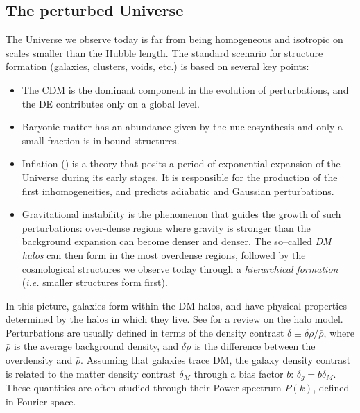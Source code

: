 \subsection{The perturbed Universe}
The Universe we observe today is far from being homogeneous and isotropic on scales smaller than the Hubble length. The standard scenario for structure formation (galaxies, clusters, voids, etc.) is based on several key points:
\begin{itemize}
\item The CDM is the dominant component in the evolution of perturbations, and the DE contributes only on a global level.
\item Baryonic matter has an abundance given by the nucleosynthesis and only a small fraction is in bound structures.  
\item Inflation (\citealt{guth,linde}) is a theory that posits a period of exponential expansion of the Universe during its early stages. It is responsible for the production of the first inhomogeneities, and predicts adiabatic and Gaussian perturbations. %
\item Gravitational instability is the phenomenon that guides the growth of such perturbations: over-dense regions where gravity is stronger than the background expansion can become denser and denser. The so--called \emph{DM halos} can then form in the most overdense regions, followed by the cosmological structures we observe today through a \emph{hierarchical formation} (\emph{i.e.} smaller structures form first).
\end{itemize}
In this picture, galaxies form within the DM halos, and have physical properties determined by the halos in which they live. See \citealt{halomodel} for a review on the halo model. Perturbations are usually defined in terms of the density contrast $\delta\equiv \delta \rho/\bar{\rho}$, where $\bar{\rho}$ is the average background density, and $\delta\rho$ is the difference between the overdensity and $\bar{\rho}$. Assuming that galaxies trace DM, the galaxy density contrast is related to the matter density contrast $\delta_M$ through a bias factor $b$: $\delta_g=b\delta_M$. These quantities are often studied through their Power spectrum $P(k)$, defined in Fourier space.



